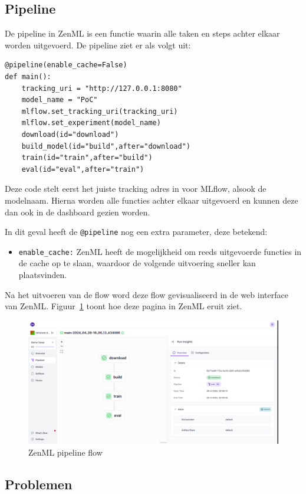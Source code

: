 \subsection{Pipeline}
De pipeline in ZenML is een functie waarin alle taken en steps achter elkaar worden uitgevoerd. De pipeline ziet er als volgt uit:
\begin{verbatim}
@pipeline(enable_cache=False)
def main():
    tracking_uri = "http://127.0.0.1:8080"
    model_name = "PoC"
    mlflow.set_tracking_uri(tracking_uri)
    mlflow.set_experiment(model_name)
    download(id="download")
    build_model(id="build",after="download")
    train(id="train",after="build")
    eval(id="eval",after="train")
\end{verbatim}
Deze code stelt eerst het juiste tracking adres in voor MLflow, alsook de modelnaam. Hierna worden alle functies achter elkaar uitgevoerd en kunnen deze dan ook in de dashboard gezien worden.

In dit geval heeft de \texttt{@pipeline} nog een extra parameter, deze betekend:

\begin{itemize}
    \item \texttt{enable\_cache:} ZenML heeft de mogelijkheid om reeds uitgevoerde functies in de cache op te slaan, waardoor de volgende uitvoering sneller kan plaatsvinden.
\end{itemize}

Na het uitvoeren van de flow word deze flow gevisualiseerd in de web interface van ZenML. Figuur~\ref{fig:ZenML_Pipeline_Flow} toont hoe deze pagina in ZenML eruit ziet.
\begin{figure}
    \centering
    \includegraphics[width=0.9\linewidth]{graphics/ZenML_Pipeline_Flow.PNG}
    \caption{ZenML pipeline flow}
    \label{fig:ZenML_Pipeline_Flow}
\end{figure}
\subsection{Problemen}

